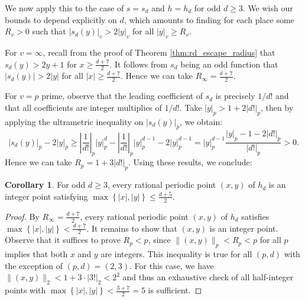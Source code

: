 \documentclass[12pt]{amsart}
\theoremstyle{definition}
\newtheorem{corollary}[theorem]{Corollary}
\begin{document}
We now apply this to the case of $s = s_d$ and $h = h_d$ for odd $d \geq 3$. We wish our bounds to depend explicitly on $d$, which amounts to finding for each place some $R_v>0$ such that $|s_d(y)|_v > 2|y|_v$ for all $|y|_v\geq R_v$.

For $v = \infty$, recall from the proof of Theorem \ref{thm:rd_escape_radius} that $s_d(y) > 2y + 1$ for $x\geq \frac{d+7}{2}$. It follows from $s_d$ being an odd function that $|s_d(y)| > 2|y|$ for all $|x|\geq \frac{d+7}{2}$. Hence we can take $R_{\infty} = \frac{d+7}{2}$.

For $v = p$ prime, observe that the leading coefficient of $s_d$ is precisely $1/d!$ and that all coefficients are integer multiplies of $1/d!$. Take $|y|_p > 1 + 2|d!|_p$, then by applying the ultrametric inequality on $|s_d(y)|_p$, we obtain:
$$ |s_d(y)|_p - 2|y|_p \geq \left|\frac{1}{d!}\right|_p|y|_p^d - \left|\frac{1}{d!}\right|_p|y|_p^{d-1} - 2|y|_p^{d-1} 
= |y|_p^{d-1}\frac{|y|_p - 1-2|d!|_p}{|d!|_p} > 0.$$
Hence we can take $R_p = 1 + 3|d!|_p$. Using these results, we conclude:

\begin{corollary}
For odd $d\geq 3$, every rational periodic point $(x,y)$ of $h_d$ is an integer point satisfying $\max\left\{|x|,|y|\right\} \leq \frac{d+5}{2}$.
\end{corollary}
\begin{proof}
    By $R_{\infty} = \frac{d+7}{2}$, every rational periodic point $(x,y)$ of $h_d$ satisfies $\max\left\{|x|,|y|\right\} < \frac{d+7}{2}$. It remains to show that $(x,y)$ is an integer point. Observe that it suffices to prove $R_p < p$, since $\|(x,y)\|_p < R_p < p$ for all $p$ implies that both $x$ and $y$ are integers. This inequality is true for all $(p,d)$ with the exception of $(p,d)=(2,3)$. For this case, we have $\|(x,y)\|_2 < 1 + 3\cdot|3!|_2 < 2^2$ and thus an exhaustive check of all half-integer points with $\max\left\{|x|,|y|\right\} < \frac{3+7}{2}=5$ is sufficient.
\end{proof}
\end{document}
